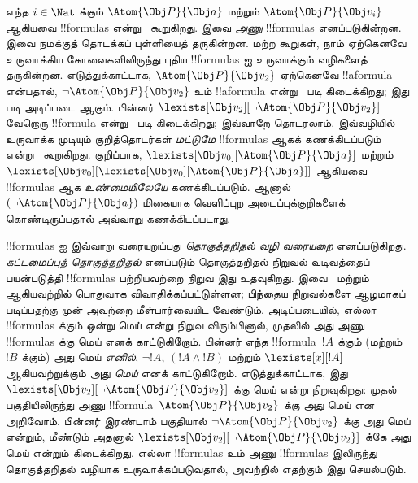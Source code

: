\documentclass[../../../include/open-logic-section]{subfiles}
\begin{document}
எந்த $i \in \Nat$ க்கும் $\Atom{\Obj P}{\Obj a}$ மற்றும்
$\Atom{\Obj P}{\Obj v_i}$ ஆகியவை !!{formula}s என்று~
கூறுகிறது. இவை \emph{அணு} !!{formula}s எனப்படுகின்றன. இவை நமக்குத்
தொடக்கப் புள்ளியைத் தருகின்றன. மற்ற கூறுகள், நாம் ஏற்கெனவே உருவாக்கிய
கோவைகளிலிருந்து புதிய !!{formula}s ஐ உருவாக்கும் வழிகளைத் தருகின்றன.
எடுத்துக்காட்டாக, $\Atom{\Obj P}{\Obj v_2}$ ஏற்கெனவே !!a{formula} என்பதால்,
$\lnot \Atom{\Obj P}{\Obj v_2}$ உம் !!a{formula} என்று~
படி கிடைக்கிறது; இது~ படி அடிப்படை ஆகும்.
பின்னர்
$\lexists[\Obj v_2][\lnot \Atom{\Obj P}{\Obj v_2}]$ வேறொரு !!{formula}
என்று~ படி கிடைக்கிறது; இவ்வாறே தொடரலாம். இவ்வழியில் உருவாக்க
முடியும் குறித்தொடர்கள் \emph{மட்டுமே} !!{formula}s ஆகக் கணக்கிடப்படும்
என்று~ கூறுகிறது. குறிப்பாக,
$\lexists[\Obj v_0][\Atom{\Obj P}{\Obj a}]$ மற்றும் $\lexists[\Obj
  v_0][\lexists[\Obj v_0][\Atom{\Obj P}{\Obj a}]]$ ஆகியவை
!!{formula}s ஆக \emph{உண்மையிலேயே} கணக்கிடப்படும். ஆனால்
$(\lnot \Atom{\Obj P}{\Obj a})$ மிகையாக வெளிப்புற அடைப்புக்குறிகளைக்
கொண்டிருப்பதால் அவ்வாறு கணக்கிடப்படாது.

!!{formula}s ஐ இவ்வாறு வரையறுப்பது \emph{தொகுத்தறிதல் வழி வரையறை}
எனப்படுகிறது. \emph{கட்டமைப்புத் தொகுத்தறிதல்} எனப்படும் தொகுத்தறிதல் நிறுவல்
வடிவத்தைப் பயன்படுத்தி !!{formula}s பற்றியவற்றை நிறுவ இது உதவுகிறது.
இவை~ மற்றும்  ஆகியவற்றில்
பொதுவாக விவாதிக்கப்பட்டுள்ளன; பிந்தைய நிறுவல்களை ஆழமாகப் படிப்பதற்கு முன்
அவற்றை மீள்பார்வையிட வேண்டும். அடிப்படையில், எல்லா !!{formula}s க்கும் ஒன்று
மெய் என்று நிறுவ விரும்பினால், முதலில் அது அணு !!{formula}s க்கு மெய் எனக்
காட்டுகிறோம். பின்னர் எந்த !!{formula}~$!A$ க்கும் (மற்றும்~$!B$ க்கும்) அது
மெய் \emph{எனில்}, $\lnot !A$, $(!A \land !B)$ மற்றும் $\lexists[x][!A]$
ஆகியவற்றுக்கும் அது \emph{மெய்} எனக் காட்டுகிறோம். எடுத்துக்காட்டாக, இது
$\lexists[\Obj v_2][\lnot \Atom{\Obj P}{\Obj v_2}]$ க்கு மெய் என்று
நிறுவுகிறது: முதல் பகுதியிலிருந்து அணு !!{formula}~$\Atom{\Obj P}{\Obj v_2}$
க்கு அது மெய் என அறிவோம். பின்னர் இரண்டாம் பகுதியால்
$\lnot \Atom{\Obj P}{\Obj v_2}$ க்கு அது மெய் என்றும், மீண்டும் அதனால்
$\lexists[\Obj v_2][\lnot \Atom{\Obj P}{\Obj v_2}]$ க்கே அது மெய் என்றும்
கிடைக்கிறது. எல்லா !!{formula}s உம் அணு !!{formula}s இலிருந்து தொகுத்தறிதல்
வழியாக உருவாக்கப்படுவதால், அவற்றில் எதற்கும் இது செயல்படும்.
\end{document}
